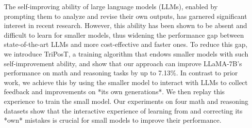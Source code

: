 The self-improving ability of large language models (LLMs), enabled by prompting them to analyze and revise their own outputs, has garnered significant interest in recent research. However, this ability has been shown to be absent and difficult to learn for smaller models, thus widening the performance gap between state-of-the-art LLMs and more cost-effective and faster ones. To reduce this gap, we introduce TriPosT, a training algorithm that endows smaller models with such self-improvement ability, and show that our approach can improve LLaMA-7B's performance on math and reasoning tasks by up to 7.13\%. In contrast to prior work, we achieve this by using the smaller model to interact with LLMs to collect feedback and improvements on *its own generations*. We then replay this experience to train the small model. Our experiments on four math and reasoning datasets show that the interactive experience of learning from and correcting its *own* mistakes is crucial for small models to improve their performance.